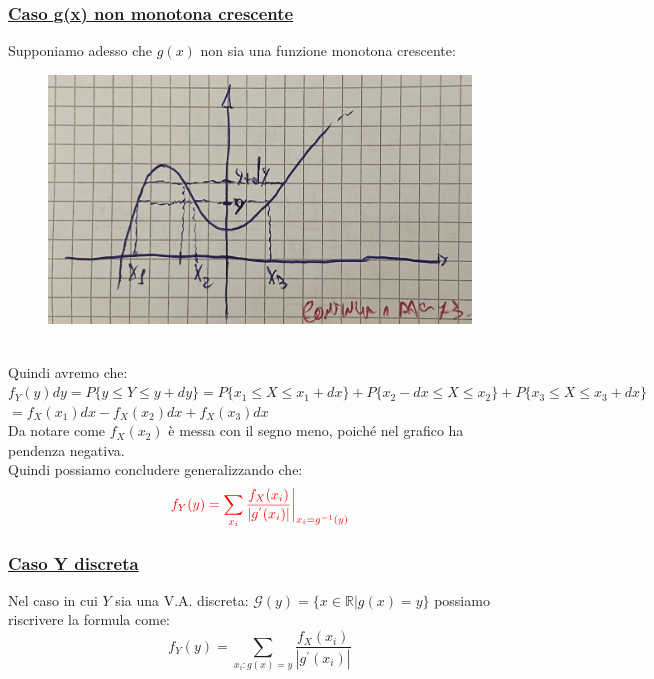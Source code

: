 \documentclass{article}
\begin{document}
\subsubsection{\underline{Caso g(x) non monotona crescente}}
Supponiamo adesso che $g(x)$ non sia una funzione monotona crescente:
\begin{figure}[ht]
\centering
\includegraphics[scale=0.13]{images/43.TeoFondNonMonoCresc.jpeg}
\end{figure} ~\\
Quindi avremo che: \\
$f_Y(y) dy = P \big\{ y \leq Y \leq y+ dy \big\} = P \big\{ x_1 \leq X \leq x_1 + dx \big\} + P \big\{ x_2 - dx \leq X \leq x_2  \big\} + P \big\{ x_3 \leq X \leq x_3 + dx \big\}$ \\
$= f_X(x_1) dx - f_X(x_2) dx + f_X(x_3) dx$ \\
Da notare come $f_X(x_2)$ è messa con il segno meno, poiché nel grafico ha pendenza negativa. \\
Quindi possiamo concludere generalizzando che:
\[\color{red} f_Y(y) = \sum_{x_i} \frac{f_X(x_i)}{| g^{'}(x_i)|} \bigg|_{ x_i = g^{-1}(y)}\]
\subsubsection{\underline{Caso Y discreta}}
Nel caso in cui $Y$ sia una V.A. discreta: $\mathcal{G}(y) = \big\{ x \in \mathbb{R} \big| g(x) = y\big\}$ possiamo riscrivere la formula come:
\[ f_Y(y) = \sum_{x_i : g(x)=y} \frac{f_X(x_i)}{| g^{'}(x_i)|} \]
\end{document}
